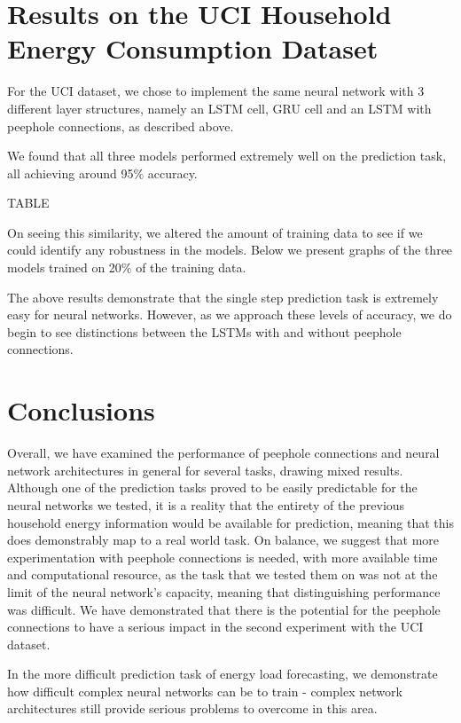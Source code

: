 \documentclass{article} %
\begin{document}
\section{Results on the UCI Household Energy Consumption Dataset}
\label{sec:house}

For the UCI dataset, we chose to implement the same neural network with 3 different layer structures, namely an LSTM cell, GRU cell and an LSTM with peephole connections, as described above. 

We found that all three models performed extremely well on the prediction task, all achieving around 95\% accuracy. 


TABLE

On seeing this similarity, we altered the amount of training data to see if we could identify any robustness in the models. Below we present graphs of the three models trained on 20\% of the training data.



The above results demonstrate that the single step prediction task is extremely easy for neural networks. However, as we approach these levels of accuracy, we do begin to see distinctions between the LSTMs with and without peephole connections. 



\section{Conclusions}
\label{sec:conclusions}

Overall, we have examined the performance of peephole connections and neural network architectures in general for several tasks, drawing mixed results. Although one of the prediction tasks proved to be easily predictable for the neural networks we tested, it is a reality that the entirety of the previous household energy information would be available for prediction, meaning that this does demonstrably map to a real world task. On balance, we suggest that more experimentation with peephole connections is needed, with more available time and computational resource, as the task that we tested them on was not at the limit of the neural network's capacity, meaning that distinguishing performance was difficult. We have demonstrated that there is the potential for the peephole connections to have a serious impact in the second experiment with the UCI dataset. 

In the more difficult prediction task of energy load forecasting, we demonstrate how difficult complex neural networks can be to train - complex network architectures still provide serious problems to overcome in this area. 
\end{document}
